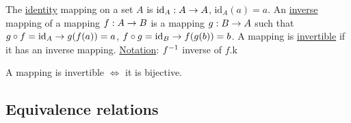 \documentclass[]{article}
\begin{document}
\begin{definition}
	The \ul{identity} mapping on a set $A$ is $\text{id}_A: A\rightarrow A$, $\text{id}_A(a) = a$.
	An \ul{inverse} mapping of a mapping $f:A\rightarrow B$ is a mapping $g:B\rightarrow A$ such that $g\circ f = \text{id}_A \rightarrow g(f(a)) = a$, $f\circ g = \text{id}_B \rightarrow f(g(b)) = b$.
	A mapping is \ul{invertible} if it has an inverse mapping. \ul{Notation}: $f^{-1}$ inverse of $f$.k
\end{definition}

\begin{theorem}
	A mapping is invertible $\Leftrightarrow$ it is bijective.
\end{theorem}

\subsection*{Equivalence relations}
\end{document}

